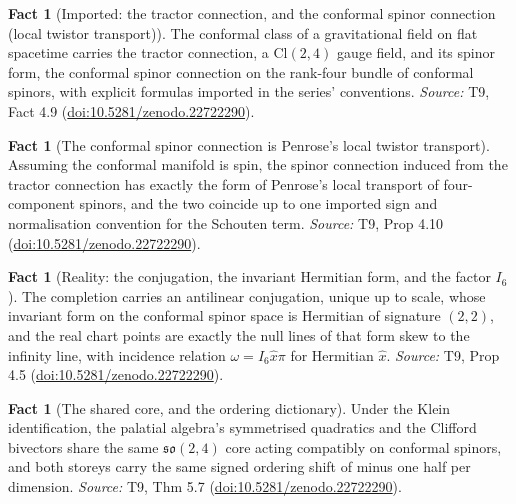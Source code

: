 \documentclass[11pt]{article}
\theoremstyle{definition}
\newtheorem{fact}[theorem]{Fact}
\theoremstyle{plain}
\providecommand{\Cl}{}\renewcommand{\Cl}{\mathrm{Cl}}
\begin{document}
\begin{fact}[Imported: the tractor connection, and the conformal spinor connection (local twistor transport)]\label{c:correspondence.imported-tractor-connection-local-twistor-transport}
The conformal class of a gravitational field on flat spacetime carries the tractor connection, a $\Cl(2,4)$ gauge field, and its spinor form, the conformal spinor connection on the rank-four bundle of conformal spinors, with explicit formulas imported in the series' conventions.
\emph{Source:} T9, Fact 4.9 (\href{https://doi.org/10.5281/zenodo.22722290}{doi:10.5281/zenodo.22722290}).
\end{fact}

\begin{fact}[The conformal spinor connection is Penrose's local twistor transport]\label{c:correspondence.local-twistor-transport-ascended-spinor-connection}
Assuming the conformal manifold is spin, the spinor connection induced from the tractor connection has exactly the form of Penrose's local transport of four-component spinors, and the two coincide up to one imported sign and normalisation convention for the Schouten term.
\emph{Source:} T9, Prop 4.10 (\href{https://doi.org/10.5281/zenodo.22722290}{doi:10.5281/zenodo.22722290}).
\end{fact}

\begin{fact}[Reality: the conjugation, the invariant Hermitian form, and the factor $I_6$]\label{c:correspondence.reality-conjugation-twistor-form-factor}
The completion carries an antilinear conjugation, unique up to scale, whose invariant form on the conformal spinor space is Hermitian of signature $(2,2)$, and the real chart points are exactly the null lines of that form skew to the infinity line, with incidence relation $\omega = I_6\hat x\pi$ for Hermitian $\hat x$.
\emph{Source:} T9, Prop 4.5 (\href{https://doi.org/10.5281/zenodo.22722290}{doi:10.5281/zenodo.22722290}).
\end{fact}

\begin{fact}[The shared core, and the ordering dictionary]\label{c:correspondence.shared-core-ordering-dictionary}
Under the Klein identification, the palatial algebra's symmetrised quadratics and the Clifford bivectors share the same $\mathfrak{so}(2,4)$ core acting compatibly on conformal spinors, and both storeys carry the same signed ordering shift of minus one half per dimension.
\emph{Source:} T9, Thm 5.7 (\href{https://doi.org/10.5281/zenodo.22722290}{doi:10.5281/zenodo.22722290}).
\end{fact}
\end{document}
